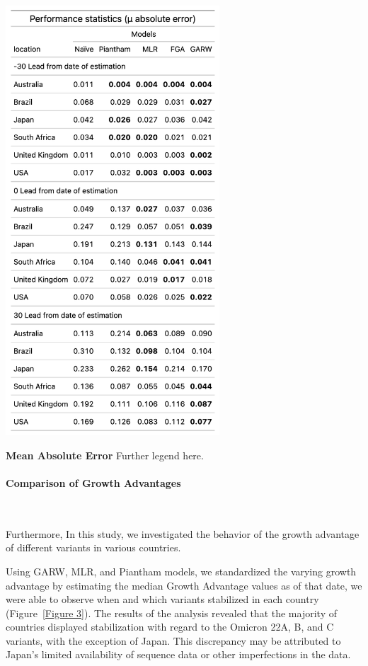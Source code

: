 \documentclass[11pt,oneside,letterpaper]{article}
\begin{document}
\begin{table}[H]
	\centering
	\includegraphics[width=0.6\textwidth]{figures/model_comp_table.png}
	\caption{\textbf{Mean Absolute Error}
	Further legend here.
	}
	\label{table1}
\end{table}

\paragraph{Comparison of Growth Advantages}\

Furthermore, In this study, we investigated the behavior of the growth advantage of different variants in various countries.

Using GARW, MLR, and Piantham models, we standardized the varying growth advantage by estimating the median Growth Advantage values as of that date, we were able to observe when and which variants stabilized in each country (Figure~\ref{Figure 3}). 
The results of the analysis revealed that the majority of countries displayed stabilization with regard to the Omicron 22A, B, and C variants, with the exception of Japan.
This discrepancy may be attributed to Japan's limited availability of sequence data or other imperfections in the data.
\end{document}
